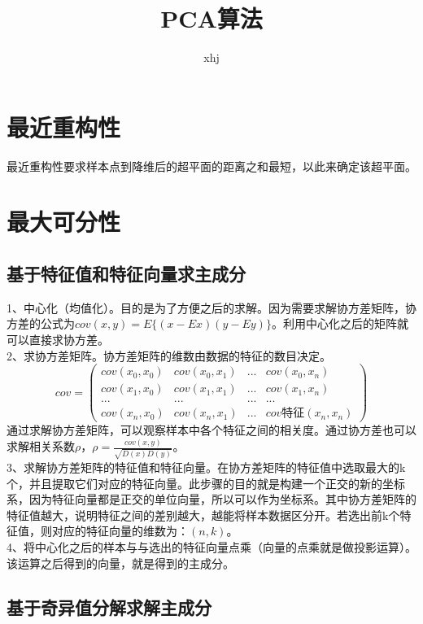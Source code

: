 \documentclass{article}
\author{xhj}
\title{PCA算法}
\begin{document}
\begin{CJK}{UTF8}{gkai}    %
\maketitle

\section{最近重构性}
最近重构性要求样本点到降维后的超平面的距离之和最短，以此来确定该超平面。

\section{最大可分性}
\subsection{基于特征值和特征向量求主成分}

1、中心化（均值化）。目的是为了方便之后的求解。因为需要求解协方差矩阵，协方差的公式为$cov(x,y)=E\{(x-Ex)(y-Ey)\}$。利用中心化之后的矩阵就可以直接求协方差。\\

2、求协方差矩阵。协方差矩阵的维数由数据的特征的数目决定。
\begin{equation}
cov=
\left(
\begin{array}{cccc}
cov(x_0,x_0) & cov(x_0,x_1) & ... & cov(x_0,x_n)\\
cov(x_1,x_0) & cov(x_1,x_1) & ... & cov(x_1,x_n)\\
... & ... & ... & ...\\
cov(x_n,x_0) & cov(x_n,x_1) & ... & cov特征(x_n,x_n)
\end{array}
\right)
\end{equation}
通过求解协方差矩阵，可以观察样本中各个特征之间的相关度。通过协方差也可以求解相关系数$\rho$，$\rho=\frac{cov(x,y)}{\sqrt{D(x)D(y)}}$。\\

3、求解协方差矩阵的特征值和特征向量。在协方差矩阵的特征值中选取最大的k个，并且提取它们对应的特征向量。此步骤的目的就是构建一个正交的新的坐标系，因为特征向量都是正交的单位向量，所以可以作为坐标系。其中协方差矩阵的特征值越大，说明特征之间的差别越大，越能将样本数据区分开。若选出前k个特征值，则对应的特征向量的维数为：$(n,k)$。\\

4、将中心化之后的样本与与选出的特征向量点乘（向量的点乘就是做投影运算）。该运算之后得到的向量，就是得到的主成分。\\

\subsection{基于奇异值分解求解主成分}


\end{CJK}
\end{document}
